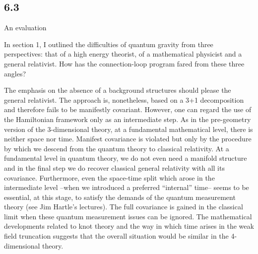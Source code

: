 \goodbreak
\subsection{6.3}{An evaluation}%

In section 1, I outlined the difficulties of quantum gravity from three
perspectives: that of a high energy theorist, of a mathematical physicist
and a general relativist. How has the connection-loop program fared from
these three angles?

The emphasis on the absence of a background structures should please the
general relativist. The approach is, nonetheless, based on a 3+1 decomposition
and therefore fails to be manifestly covariant. However, one can regard the
use of the Hamiltonian framework only as an intermediate step. As in the
pre-geometry version of the
3-dimensional theory, at a fundamental mathematical level, there is neither
space nor time. Manifest covariance is violated but only by the procedure by
which we descend from the quantum theory to classical relativity. At a
fundamental level in quantum theory, we do not even need a manifold structure
and in the final step we do recover classical general relativity with all
its covariance. Furthermore, even the space-time split which arose in the
intermediate level --when we introduced a preferred ``internal'' time-- seems
to be essential, at this stage, to satisfy the demands of the quantum
measurement theory (see Jim Hartle's lectures). The full covariance is gained
in the classical limit when these quantum measurement issues can be ignored.
The mathematical
developments related to knot theory and the way in which time arises in the
weak field truncation suggests that the overall situation would be
similar in the 4-dimensional theory.


